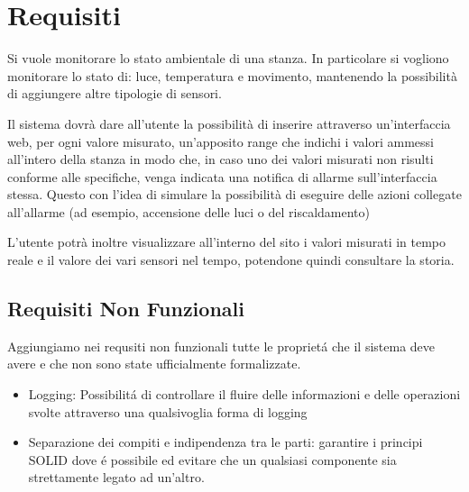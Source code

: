\section{Requisiti}

Si vuole monitorare lo stato ambientale di una stanza. In particolare si vogliono monitorare lo stato di: luce, temperatura e movimento, mantenendo la possibilità di aggiungere altre tipologie di sensori.

Il sistema dovrà dare all'utente la possibilità di inserire attraverso un'interfaccia web, per ogni valore misurato, un'apposito range che indichi i valori ammessi all'intero della stanza in modo che, in caso uno dei valori misurati non risulti conforme alle specifiche, venga indicata una notifica di allarme sull'interfaccia stessa. Questo con l'idea di simulare la possibilità di eseguire delle azioni collegate all'allarme (ad esempio, accensione delle luci o del riscaldamento)

L'utente potrà inoltre visualizzare all'interno del sito i valori misurati in tempo reale e il valore dei vari sensori nel tempo, potendone quindi consultare la storia.

\subsection{Requisiti Non Funzionali}

Aggiungiamo nei requsiti non funzionali tutte le propriet\'a che il sistema deve avere e che non sono state ufficialmente formalizzate.

\begin{itemize}
  \item Logging: Possibilit\'a di controllare il fluire delle informazioni e delle operazioni svolte attraverso una qualsivoglia forma di logging
  \item Separazione dei compiti e indipendenza tra le parti: garantire i principi SOLID dove \'e possibile ed evitare che un qualsiasi componente sia strettamente legato ad un'altro.
\end{itemize}
